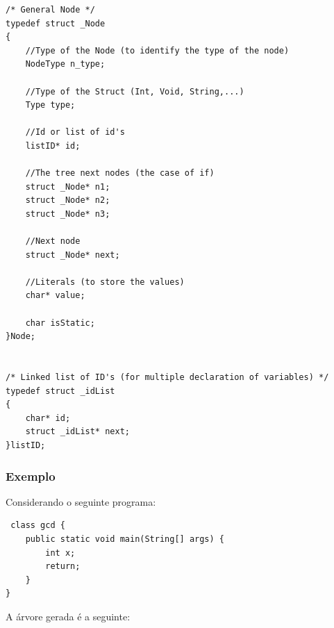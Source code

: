 \documentclass[12pt]{article}
\begin{document}
\begin{lstlisting}
/* General Node */
typedef struct _Node
{
    //Type of the Node (to identify the type of the node)
	NodeType n_type;

    //Type of the Struct (Int, Void, String,...)
	Type type;

    //Id or list of id's
    listID* id;

    //The tree next nodes (the case of if)
    struct _Node* n1;
    struct _Node* n2;
    struct _Node* n3;

    //Next node
    struct _Node* next;

    //Literals (to store the values)
    char* value;

    char isStatic;
}Node;


/* Linked list of ID's (for multiple declaration of variables) */
typedef struct _idList
{
	char* id;
	struct _idList* next;
}listID;

\end{lstlisting}
 

\subsubsection{Exemplo}
Considerando o seguinte programa:


\begin{lstlisting}
 class gcd {
 	public static void main(String[] args) {
    	int x;
    	return;
	} 		
}
\end{lstlisting}

A árvore gerada é a seguinte:
\end{document}
